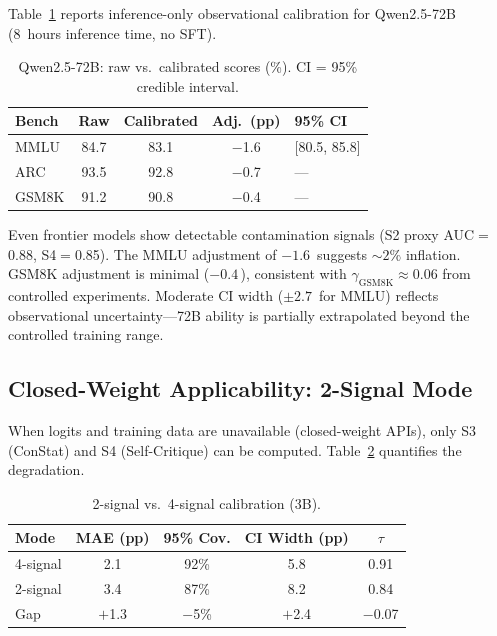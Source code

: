\documentclass[11pt,a4paper]{article}
\newcommand{\pp}{\,\text{pp}}
\begin{document}
Table~\ref{tab:72b} reports inference-only observational calibration for Qwen2.5-72B (8~hours inference time, no SFT).

\begin{table}[t]
\centering
\small
\caption{Qwen2.5-72B: raw vs.\ calibrated scores (\%). CI = 95\% credible interval.}
\label{tab:72b}
\begin{tabular}{lcccl}
\toprule
Bench & Raw & Calibrated & Adj.\ (pp) & 95\% CI \\
\midrule
MMLU  & 84.7 & 83.1 & $-$1.6 & [80.5, 85.8] \\
ARC   & 93.5 & 92.8 & $-$0.7 & --- \\
GSM8K & 91.2 & 90.8 & $-$0.4 & --- \\
\bottomrule
\end{tabular}
\end{table}

Even frontier models show detectable contamination signals (S2 proxy AUC$=$0.88, S4$=$0.85).
The MMLU adjustment of $-1.6$\pp{} suggests ${\sim}2\%$ inflation.
GSM8K adjustment is minimal ($-0.4$\pp{}), consistent with $\gamma_{\text{GSM8K}}\approx 0.06$ from controlled experiments.
Moderate CI width ($\pm 2.7$\pp{} for MMLU) reflects observational uncertainty---72B ability is partially extrapolated beyond the controlled training range.


\subsection{Closed-Weight Applicability: 2-Signal Mode}
\label{sec:2signal}

When logits and training data are unavailable (closed-weight APIs), only S3 (ConStat) and S4 (Self-Critique) can be computed.
Table~\ref{tab:2sig} quantifies the degradation.

\begin{table}[t]
\centering
\small
\caption{2-signal vs.\ 4-signal calibration (3B).}
\label{tab:2sig}
\begin{tabular}{lcccc}
\toprule
Mode & MAE (pp) & 95\% Cov. & CI Width (pp) & $\tau$ \\
\midrule
4-signal & 2.1 & 92\% & 5.8 & 0.91 \\
2-signal & 3.4 & 87\% & 8.2 & 0.84 \\
\midrule
Gap      & $+$1.3 & $-$5\% & $+$2.4 & $-$0.07 \\
\bottomrule
\end{tabular}
\end{table}
\end{document}
